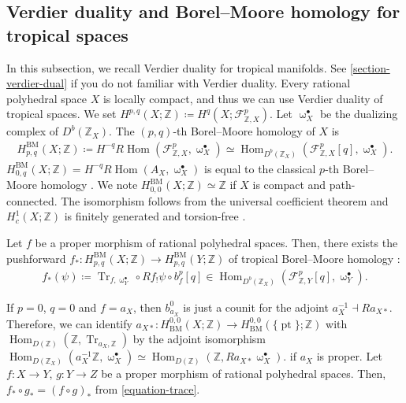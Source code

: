 \documentclass[a4paper,dvipdfmx,reqno,12pt]{amsart}
\theoremstyle{definition}
\newcommand{\deq}{\coloneqq}
\newcommand{\Z}{\mathbb{Z}}%
\newcommand{\opn}[1]{\operatorname{#1}}
\numberwithin{equation}{section}
\begin{document}
\subsection{Verdier duality and Borel--Moore homology
for tropical spaces}
In this subsection, we recall Verdier duality for
tropical manifolds.
See \cref{section-verdier-dual} if you do not familiar 
with Verdier duality.
Every rational polyhedral space $X$ is locally compact, 
and thus we can use Verdier duality of tropical spaces.
We set $H^{p,q}(X;\mathbb{Z})\deq 
H^{q}(X;\mathcal{F}_{\mathbb{Z},X}^{p})$. 
Let $\upomega_X^{\bullet}$ be the dualizing complex 
of $D^{b}(\mathbb{Z}_X)$.
The $(p,q)$-th Borel--Moore homology of $X$ is
\begin{align}
H^{\opn{BM}}_{p,q}(X;\Z)\deq 
H^{-q}R\opn{Hom}(\mathcal{F}_{\mathbb{Z},X}^{p},\upomega_X^{\bullet})\simeq 
\opn{Hom}_{D^{b}(\mathbb{Z}_X)}(\mathcal{F}_{\mathbb{Z},X}^{p}[q],\upomega_X^{\bullet}).
\end{align}
$H_{0,q}^{\opn{BM}}(X;\Z)=
H^{-q}R\opn{Hom}(A_X,\upomega_X^{\bullet})$ 
is equal to the classical $p$-th Borel--Moore homology
\cite[Lemma 4.8]{gross2019sheaftheoretic}.
We note $H_{0,0}^{\opn{BM}}(X;\mathbb{Z})\simeq 
 \mathbb{Z}$ if 
$X$ is compact and path-connected.
The isomorphism follows from the universal 
coefficient theorem and 
$H^{1}_c(X;\mathbb{Z})$ is finitely generated and
torsion-free 
\cite[VI.Proposition 5.3]{iversenCohomologySheaves1986a}.

Let $f$ be a proper morphism of rational polyhedral 
spaces.
Then, there exists the pushforward
$f_*\colon H_{p,q}^{\mathrm{BM}}(X;\mathbb{Z})
\to H_{p,q}^{\mathrm{BM}}(Y;\mathbb{Z})$
of tropical Borel--Moore homology 
\cite[Definition 4.9]{gross2019sheaftheoretic}:
\begin{align}
f_*(\psi)\deq \opn{Tr}_{f,\upomega_Y^{\bullet}}\circ 
Rf_!\psi \circ b_{f}^{p}[q]\in 
\opn{Hom}_{D^{b}(\mathbb{Z}_X)}(
\mathcal{F}^{p}_{\mathbb{Z},Y}[q],\upomega_Y^{\bullet}).
\end{align}

If $p=0$, $q=0$ and $f=a_X$, 
then $b^{0}_{a_X}$ is just a counit for 
the adjoint $a^{-1}_X\dashv Ra_{X*}$.
Therefore, we can identify
$a_{X*}\colon H_{\opn{BM}}^{0,0}(X;\mathbb{Z})
\to H_{\opn{BM}}^{0,0}(\{\opn{pt}\};\mathbb{Z})$
with $\opn{Hom}_{D(\mathbb{Z})}(\mathbb{Z},\opn{Tr}_{a_X,\mathbb{Z}})$
by the adjoint isomorphism
$\opn{Hom}_{D(\mathbb{Z}_X)}(a_X^{-1}\mathbb{Z},
\upomega_X^{\bullet})\simeq 
\opn{Hom}_{D(\mathbb{Z})}(\mathbb{Z},Ra_{X*}\upomega_X^{\bullet})$. 
if $a_X$ is proper.
Let $f\colon X\to Y$, $g\colon Y\to Z$ be a proper 
morphism of rational polyhedral spaces.
Then, $f_*\circ g_*=(f\circ g)_*$ from 
\cref{equation-trace}.
\end{document}

